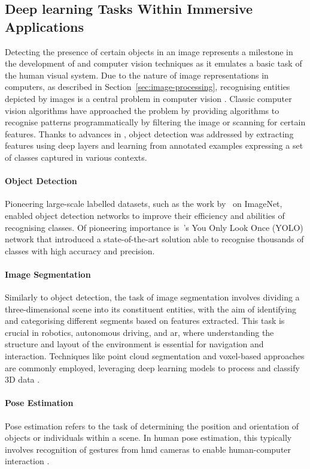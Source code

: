 \subsection{Deep learning Tasks Within Immersive Applications}
Detecting the presence of certain objects in an image represents a milestone in the development of  and computer vision techniques as it emulates a basic task of the human visual system. Due to the nature of image representations in computers, as described in Section~\ref{sec:image-processing}, recognising entities depicted by images is a central problem in computer vision \citep{szeliski2022computer}. Classic computer vision algorithms have approached the problem by providing algorithms to recognise patterns programmatically by filtering the image or scanning for certain features. Thanks to advances in , object detection was addressed by extracting features using deep layers and learning from annotated examples expressing a set of classes captured in various contexts.\par
\paragraph{Object Detection}
Pioneering large-scale labelled datasets, such as the work by~\cite{deng2009imagenet} on ImageNet, enabled object detection networks to improve their efficiency and abilities of recognising classes. Of pioneering importance is~\cite{Redmon_2016_CVPR}'s You Only Look Once (YOLO) network that introduced a state-of-the-art solution able to recognise thousands of classes with high accuracy and precision.\par
\paragraph{Image Segmentation}
Similarly to object detection, the task of image segmentation involves dividing a three-dimensional scene into its constituent entities, with the aim of identifying and categorising different segments based on features extracted. This task is crucial in robotics, autonomous driving, and \acrshort{ar}, where understanding the structure and layout of the environment is essential for navigation and interaction. Techniques like point cloud segmentation and voxel-based approaches are commonly employed, leveraging deep learning models to process and classify 3D data \citep{minae_segmentation, feng2020semantic3d, kalogerakis20173d}.\par
\paragraph{Pose Estimation}
Pose estimation refers to the task of determining the position and orientation of objects or individuals within a scene. In human pose estimation, this typically involves recognition of gestures from \acrshort{hmd} cameras to enable human-computer interaction \citep{andriluka20142d, spittle2022review}.\par
